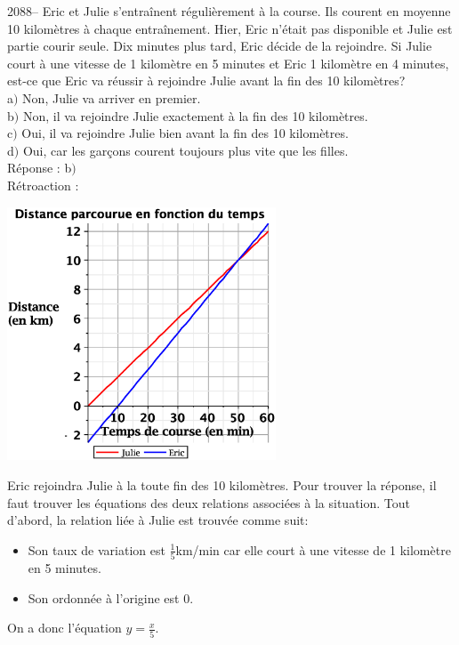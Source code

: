 \documentclass[letterpaper, 12pt]{article}
\begin{document}
2088-- Eric et Julie s'entra\^inent r\'eguli\`erement \`a la course. Ils courent en moyenne 10 kilom\`etres \`a chaque entra\^inement. Hier, Eric n'\'etait pas disponible et Julie est partie courir seule. Dix minutes plus tard, Eric d\'ecide de la rejoindre.  Si Julie court \`a une vitesse de 1 kilom\`etre en 5 minutes et Eric 1 kilom\`etre en 4 minutes, est-ce que Eric va r\'eussir \`a rejoindre Julie avant la fin des 10 kilom\`etres?\\

a$)$ Non, Julie va arriver en premier.\\
b$)$ Non, il va rejoindre Julie exactement \`a la fin des 10 kilom\`etres.\\
c$)$ Oui, il va rejoindre Julie bien avant la fin des 10 kilom\`etres.\\
d$)$ Oui, car les gar\c cons courent toujours plus vite que les filles.\\

R\'eponse : b$)$\\

R\'etroaction :\\
\begin{center}
 \includegraphics[width=8cm,bb=20 177 575 614]{Q2088.eps}
\end{center}
Eric rejoindra Julie \`a la toute fin des 10 kilom\`etres. Pour trouver la r\'eponse, il faut trouver les \'equations des deux relations associ\'ees \`a la situation. Tout d'abord, la relation li\'ee \`a Julie est trouv\'ee comme suit:
\begin{itemize}
\item Son taux de variation est $\frac{1}{5}$km/min car elle court \`a une vitesse de 1 kilom\`etre en 5 minutes.
\item Son ordonn\'ee \`a l'origine est 0.
\end{itemize}
On a donc l'\'equation $y=\frac{x}{5}$.\\
\end{document}
